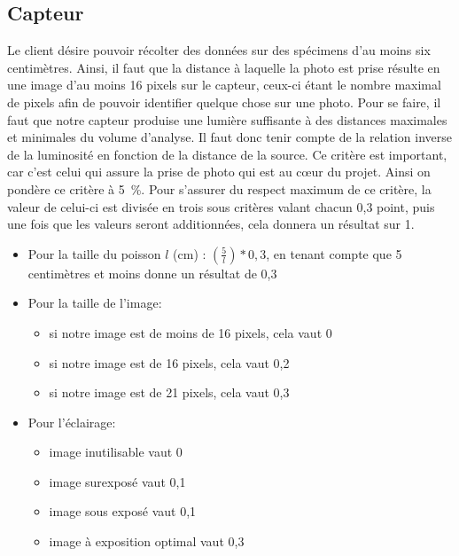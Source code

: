 

\subsection{Capteur}
\label{s:cdc_pdd_capt}

Le client désire pouvoir récolter des données sur des spécimens d’au moins six centimètres.
Ainsi, il faut que la distance à laquelle la photo est prise résulte en une image d’au moins 16 pixels sur le capteur, ceux-ci étant le nombre maximal de pixels afin de pouvoir identifier quelque chose sur une photo.
Pour se faire, il faut que notre capteur produise une lumière suffisante à des distances maximales et minimales du volume d’analyse.
Il faut donc tenir compte de la relation inverse de la luminosité en fonction de la distance de la source.
Ce critère est important, car c’est celui qui assure la prise de photo qui est au cœur du projet. Ainsi on pondère ce critère à 5~\%.
Pour s’assurer du respect maximum de ce critère, la valeur de celui-ci est divisée en trois sous critères valant chacun 0,3 point, puis une fois que les valeurs seront additionnées, cela donnera un résultat sur 1.

\begin{itemize}
	\item Pour la taille du poisson $l$ (cm) : $\left(\frac{5}{l}\right) * 0,3$, en tenant compte que 5 centimètres et moins donne un résultat de 0,3
	
	\item Pour la taille de l’image:
	\begin{itemize}
		\item si notre image est de moins de 16 pixels, cela vaut 0
		\item si notre image est de 16 pixels, cela vaut 0,2
		\item si notre image est de 21 pixels, cela vaut 0,3
	\end{itemize}
	\item Pour l’éclairage:
	\begin{itemize}
		\item image inutilisable vaut 0
		\item image surexposé vaut 0,1
		\item image sous exposé vaut 0,1
		\item image à exposition optimal vaut 0,3
	\end{itemize}
\end{itemize}
